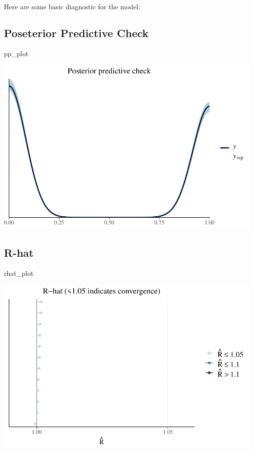 \documentclass[
  letterpaper,
  DIV=11,
  numbers=noendperiod]{scrartcl}
\newenvironment{Shaded}{\begin{snugshade}}{\end{snugshade}}
\newcommand{\NormalTok}[1]{\textcolor[rgb]{0.00,0.23,0.31}{#1}}
\begin{document}
Here are some basic diagnostic for the model:

\subsection{Poseterior Predictive Check}

\begin{Shaded}
\begin{Highlighting}[]
\NormalTok{pp\_plot}
\end{Highlighting}
\end{Shaded}

\begin{center}
\includegraphics[width=0.8\linewidth,height=\textheight,keepaspectratio]{Beyond!!!_files/figure-pdf/unnamed-chunk-7-1.pdf}
\end{center}

\subsection{R-hat}

\begin{Shaded}
\begin{Highlighting}[]
\NormalTok{rhat\_plot}
\end{Highlighting}
\end{Shaded}

\begin{center}
\includegraphics[width=0.8\linewidth,height=\textheight,keepaspectratio]{Beyond!!!_files/figure-pdf/unnamed-chunk-8-1.pdf}
\end{center}
\end{document}
